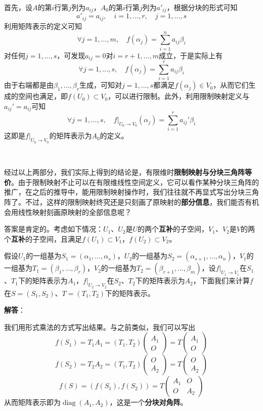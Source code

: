 \documentclass[a4paper,UTF8,fontset=windows,AutoFakeBold]{ctexart}
\DeclareMathOperator{\diag}{diag}
\newcommand{\sol}[1]{{\vspace{5pt}\kaishu\noindent\textbf{解答}：\vspace{-3pt}
\begin{compactitem}
    \item[] #1
\end{compactitem}
}}
\begin{document}
首先，设$A$的第$i$行第$j$列为$a_{ij}$，$A_0$的第$i$行第$j$列为$a'_{ij}$，根据分块的形式可知
$$a'_{ij}=a_{ij},\quad i=1,\dots,r,\quad j=1,\dots,s$$
利用矩阵表示的定义可知
$$\forall j=1,\dots,m,\quad f(\alpha_j)=\sum_{i=1}^na_{ij}\beta_i$$
对任何$j=1,\dots,s$，可发现$a_{ij}=0$对$i=r+1,\dots,m$成立，于是实际上有
$$\forall j=1,\dots,s,\quad f(\alpha_j)=\sum_{i=1}^ra_{ij}\beta_i$$
由于右端都是由$\beta_1,\dots,\beta_r$生成，可知对$j=1,\dots,s$都满足$f(\alpha_j)\in V_0$，从而它们生成的空间也满足，即$f(U_0)\subset V_0$，可以进行限制。此外，利用限制映射定义与$a_{ij}'=a_{ij}$可知
$$\forall j=1,\dots,s,\quad f|_{U_0\to V_0}(\alpha_j)=\sum_{i=1}^ra_{ij}'\beta_i$$
这即是$f|_{U_0\to V_0}$的矩阵表示为$A_0$的定义。

\

经过以上两部分，我们实际上得到的结论是，有限维时\textbf{限制映射与分块三角阵等价}。由于限制映射不止可以在有限维线性空间定义，它可以看作某种分块三角阵的推广，在之后的推导中，能用限制映射操作时，我们往往就不再显式写出分块三角阵了。不过，这样的限制映射终究还是只刻画了原映射的\textbf{部分信息}，我们能否有机会用线性映射刻画原映射的全部信息呢？

答案是肯定的。考虑如下情况：$U_1$、$U_2$是$U$的两个\textbf{互补}的子空间，$V_1$、$V_2$是$V$的两个\textbf{互补}的子空间，且满足$f(U_1)\subset V_1$，$f(U_2)\subset V_2$。

假设$U_1$的一组基为$S_1=(\alpha_1,\dots,\alpha_s)$，$U_2$的一组基为$S_2=(\alpha_{s+1},\dots,\alpha_n)$，$V_1$的一组基为$T_1=(\beta_1,\dots,\beta_r)$，$V_2$的一组基为$T_2=(\beta_{r+1},\dots,\beta_m)$，设$f|_{U_1\to V_1}$在$S_1$、$T_1$下的矩阵表示为$A_1$，$f|_{U_2\to V_2}$在$S_2$、$T_2$下的矩阵表示为$A_2$，下面我们来计算$f$在$S=(S_1,S_2)$、$T=(T_1,T_2)$下的矩阵表示。

\sol{
    我们用形式乘法的方式写出结果。与之前类似，我们可以写出
    $$f(S_1)=T_1A_1=(T_1,T_2)\begin{pmatrix}A_1\\O\end{pmatrix}=T\begin{pmatrix}A_1\\O\end{pmatrix}$$
    $$f(S_2)=T_2A_2=(T_1,T_2)\begin{pmatrix}O\\A_2\end{pmatrix}=T\begin{pmatrix}O\\A_2\end{pmatrix}$$
    $$f(S)=(f(S_1),f(S_2))=T\begin{pmatrix}A_1&O\\O&A_2\end{pmatrix}$$
    从而矩阵表示即为$\diag(A_1,A_2)$，这是一个\textbf{分块对角阵}。
}
\end{document}

